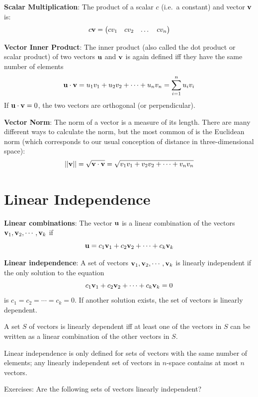 \documentclass[]{book}
\theoremstyle{definition}
\theoremstyle{definition}
\theoremstyle{definition}
\theoremstyle{remark}
\begin{document}
\textbf{Scalar Multiplication}: The product of a scalar \(c\) (i.e.~a
constant) and vector \({\bf v}\) is:\\
\[ c{\bf v} =  \begin{pmatrix} cv_1 & cv_2 & \dots & cv_n \end{pmatrix} \]

\textbf{Vector Inner Product}: The inner product (also called the dot
product or scalar product) of two vectors \({\bf u}\) and \({\bf v}\) is
again defined iff they have the same number of elements
\[ {\bf u} \cdot {\bf v} = u_1v_1 + u_2v_2 + \cdots + u_nv_n = \sum_{i = 1}^n u_iv_i\]
If \({\bf u} \cdot {\bf v} = 0\), the two vectors are orthogonal (or
perpendicular).

\textbf{Vector Norm}: The norm of a vector is a measure of its length.
There are many different ways to calculate the norm, but the most common
of is the Euclidean norm (which corresponds to our usual conception of
distance in three-dimensional space):
\[ ||{\bf v}|| = \sqrt{{\bf v}\cdot{\bf v}} = \sqrt{ v_1v_1 + v_2v_2 + \cdots + v_nv_n}\]

\section{Linear Independence}\label{linear-independence}

\textbf{Linear combinations}: The vector \({\bf u}\) is a linear
combination of the vectors \({\bf v}_1, {\bf v}_2, \cdots , {\bf v}_k\)
if \[{\bf u} = c_1{\bf v}_1 + c_2{\bf v}_2 +  \cdots + c_k{\bf v}_k\]

\textbf{Linear independence}: A set of vectors
\({\bf v}_1, {\bf v}_2, \cdots , {\bf v}_k\) is linearly independent if
the only solution to the equation
\[c_1{\bf v}_1 + c_2{\bf v}_2 +  \cdots + c_k{\bf v}_k = 0\] is
\(c_1 = c_2 = \cdots = c_k = 0\). If another solution exists, the set of
vectors is linearly dependent.

A set \(S\) of vectors is linearly dependent iff at least one of the
vectors in \(S\) can be written as a linear combination of the other
vectors in \(S\).

Linear independence is only defined for sets of vectors with the same
number of elements; any linearly independent set of vectors in
\(n\)-space contains at most \(n\) vectors.

Exercises: Are the following sets of vectors linearly independent?
\end{document}
